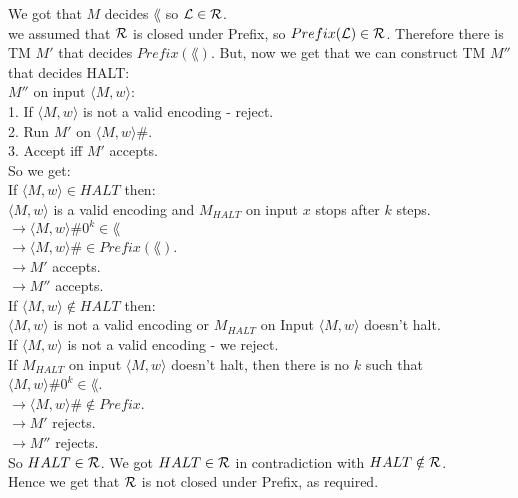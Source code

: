 \begin{enumerate}[i.]
          We got that $M$ decides $\lang$ so $\mathcal{L} \in \mathcal{R}$.\\
          we assumed that $\mathcal{R}$ is closed under Prefix, so $Prefix(\mathcal{L}) \in \mathcal{R}$.
          Therefore there is TM $M'$ that decides $Prefix(\lang)$.
          But, now we get that we can construct TM $M''$ that decides HALT: \\

          $M'' \text{ on input } \langle M, w \rangle$: \\
          1. If $\langle M, w \rangle$ is not a valid encoding - reject. \\
          2. Run $M'$ on $\langle M, w \rangle \#$. \\
          3. Accept iff $M'$ accepts. \\

          So we get: \\
          If $\langle M, w \rangle \in HALT$ then: \\
          $\langle M, w \rangle$ is a valid encoding and $M_{HALT}$ on
          input $x$ stops after $k$ steps. \\
          $\rightarrow \langle M, w \rangle \#0^k \in \lang$ \\
          $\rightarrow \langle M, w \rangle \# \in Prefix(\lang)$. \\
          $\rightarrow M'$ accepts. \\
          $\rightarrow M''$ accepts. \\

          If $\langle M, w \rangle \notin HALT$ then: \\
          $\langle M, w \rangle$ is not a valid encoding or $M_{HALT}$ on
          Input $\langle M, w \rangle$ doesn't halt. \\
          If $\langle M, w \rangle$ is not a valid encoding - we reject. \\
          If $M_{HALT}$ on input $\langle M, w \rangle$ doesn't halt, then there is no $k$
          such that $\langle M, w \rangle \#0^k \in \lang$.  \\
          $\rightarrow \langle M, w \rangle \# \notin Prefix$. \\
          $\rightarrow M'$ rejects. \\
          $\rightarrow M''$ rejects. \\

          So $HALT \in \mathcal{R}$.
          We got $HALT \in \mathcal{R}$ in contradiction with $HALT \notin \mathcal{R}$. \\
          Hence we get that $\mathcal{R}$ is not closed under Prefix, as required. \\

\end{enumerate}